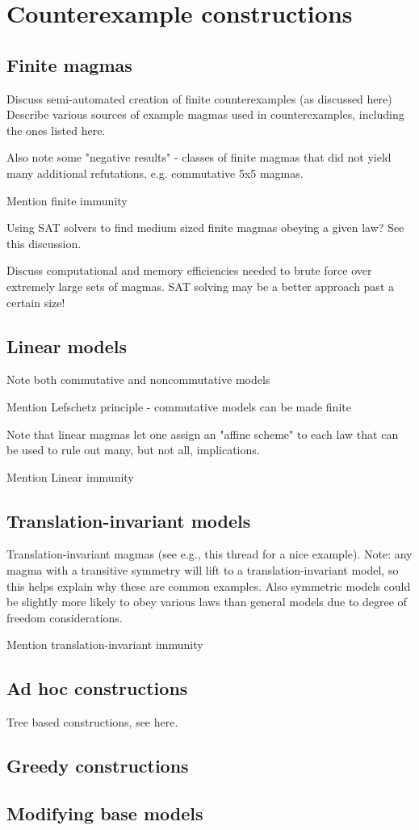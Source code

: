 \section{Counterexample constructions}


\subsection{Finite magmas}\label{finite-sec}

Discuss semi-automated creation of finite counterexamples (as discussed here)
Describe various sources of example magmas used in counterexamples, including the ones listed here.

Also note some "negative results" - classes of finite magmas that did not yield many additional refutations, e.g. commutative 5x5 magmas.

Mention finite immunity

Using SAT solvers to find medium sized finite magmas obeying a given law? See this discussion.

Discuss computational and memory efficiencies needed to brute force over extremely large sets of magmas. SAT solving may be a better approach past a certain size!

\subsection{Linear models}\label{linear-sec}

Note both commutative and noncommutative models

Mention Lefschetz principle - commutative models can be made finite

Note that linear magmas let one assign an "affine scheme" to each law that can be used to rule out many, but not all, implications.

Mention Linear immunity



\subsection{Translation-invariant models}\label{translation-sec}

Translation-invariant magmas (see e.g., this thread for a nice example). Note: any magma with a transitive symmetry will lift to a translation-invariant model, so this helps explain why these are common examples. Also symmetric models could be slightly more likely to obey various laws than general models due to degree of freedom considerations.

Mention translation-invariant immunity

\subsection{Ad hoc constructions}\label{adhoc-sec}

Tree based constructions, see here.

\subsection{Greedy constructions}\label{greedy-sec}


\subsection{Modifying base models}\label{modify-base}

